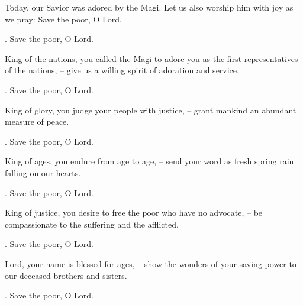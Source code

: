\lettrine[lines=2]{T}{}oday, our Savior was adored by the Magi. Let us also worship him with joy as we pray: Save the poor, O Lord.
\par \Rbar. Save the poor, O Lord.

King of the nations, you called the Magi to adore you as the first representatives of the nations,
– give us a willing spirit of adoration and service.
\par \Rbar. Save the poor, O Lord.

King of glory, you judge your people with justice,
– grant mankind an abundant measure of peace.
\par \Rbar. Save the poor, O Lord.

King of ages, you endure from age to age,
– send your word as fresh spring rain falling on our hearts.
\par \Rbar. Save the poor, O Lord.

King of justice, you desire to free the poor who have no advocate,
– be compassionate to the suffering and the afflicted.
\par \Rbar. Save the poor, O Lord.

Lord, your name is blessed for ages,
– show the wonders of your saving power to our deceased brothers and sisters.
\par \Rbar. Save the poor, O Lord.